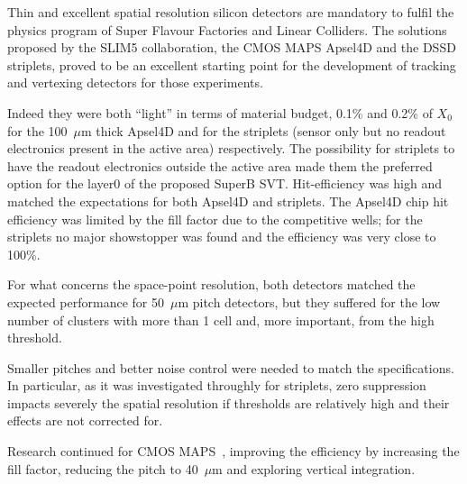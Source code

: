  Thin and excellent spatial resolution silicon detectors are mandatory to fulfil the physics program 
 of Super Flavour Factories and Linear Colliders. 
 The solutions proposed by the SLIM5 collaboration, the CMOS MAPS Apsel4D and the DSSD 
 striplets, proved to be an excellent starting point for the development of tracking and vertexing 
 detectors for those experiments. 
 
 Indeed they were both ``light'' in terms of material budget, 0.1\% and 0.2\% of $X_0$ for the 
 100~$\mu$m thick Apsel4D and for the striplets (sensor only but no readout electronics present in 
 the active area) respectively. The possibility for striplets to have the readout electronics outside 
 the active area made them the preferred option for the layer0 of the proposed SuperB SVT.
 Hit-efficiency was high and matched the expectations for both Apsel4D and striplets. The 
 Apsel4D chip hit efficiency was limited by the fill factor due to the competitive wells; 
 for the striplets no major showstopper was found and the efficiency was very close to 100\%.

 For what concerns 
 the space-point resolution, both detectors matched the expected performance for  50~$\mu$m pitch 
 detectors, 
 but they suffered for the low number of clusters with more than 1 cell and, more important, 
 from the high threshold. 
  
 Smaller pitches and better noise control were needed to 
 match the specifications. In particular, as it was investigated throughly for striplets, zero suppression 
 impacts severely the spatial resolution if thresholds are relatively high and their effects are not 
 corrected for. 
 
 Research continued for CMOS MAPS~\cite{Rizzo:2013aza}, improving the efficiency by increasing 
 the fill factor, reducing the pitch to 40~$\mu$m and exploring vertical integration.


